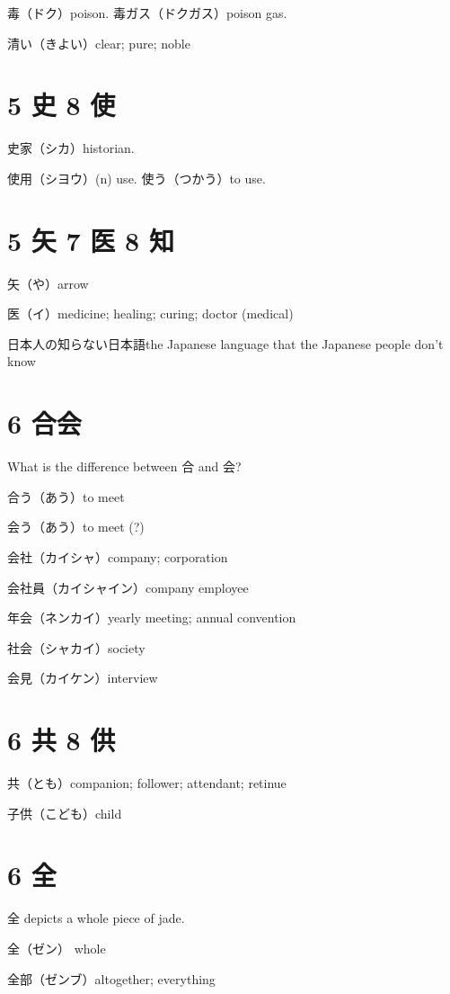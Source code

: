 毒（ドク）poison.
毒ガス（ドクガス）poison gas.

清い（きよい）clear; pure; noble

\section{5 史 8 使}

史家（シカ）historian.

使用（シヨウ）(n) use.
使う（つかう）to use.

\section{5 矢 7 医 8 知}

矢（や）arrow

医（イ）medicine; healing; curing; doctor (medical)

日本人の知らない日本語the Japanese language that the Japanese people don't know

\section{6 合会}

What is the difference between 合 and 会?

合う（あう）to meet

会う（あう）to meet (?)

会社（カイシャ）company; corporation

会社員（カイシャイン）company employee

年会（ネンカイ）yearly meeting; annual convention

社会（シャカイ）society

会見（カイケン）interview

\section{6 共 8 供}

共（とも）companion; follower; attendant; retinue

子供（こども）child

\section{6 全}

全 depicts a whole piece of jade.

全（ゼン） whole

全部（ゼンブ）altogether; everything

